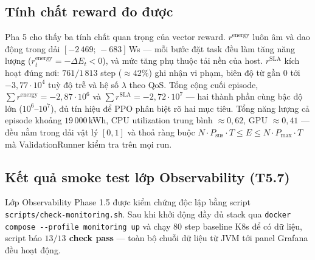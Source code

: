 \subsection{Tính chất reward đo được}
\label{ssec:res-reward-shape}

Pha 5 cho thấy ba tính chất quan trọng của vector reward.
$r^{\mathrm{energy}}$ luôn âm và dao động trong dải
$[-2\,469;\, -683]$\,Ws --- mỗi bước đặt task đều làm tăng năng lượng
($r^{\mathrm{energy}}_t = -\Delta E_t < 0$), và mức tăng phụ thuộc tải
nền của host. $r^{\mathrm{SLA}}$ kích hoạt đúng nơi: $761/1\,813$
step ($\approx 42\%$) ghi nhận vi phạm, biên độ từ gần $0$ tới
$-3{,}77\cdot 10^{4}$ tuỳ độ trễ và hệ số $\lambda$ theo QoS. Tổng
cộng cuối episode, $\sum r^{\mathrm{energy}} = -2{,}87\cdot 10^{6}$
và $\sum r^{\mathrm{SLA}} = -2{,}72\cdot 10^{7}$ --- hai thành phần
cùng bậc độ lớn ($10^6$--$10^7$), đủ tín hiệu để PPO phân biệt rõ hai
mục tiêu. Tổng năng lượng cả episode khoảng $19\,000$\,kWh, CPU
utilization trung bình $\approx 0{,}62$, GPU $\approx 0{,}41$ ---
đều nằm trong dải vật lý $[0,1]$ và thoả ràng buộc
$N \cdot P_{\mathrm{sus}} \cdot T \le E \le N \cdot P_{\max} \cdot T$
mà ValidationRunner kiểm tra trên mọi run.

\subsection{Kết quả smoke test lớp Observability (T5.7)}
\label{ssec:res-monitoring}

Lớp Observability Phase 1.5 được kiểm chứng độc lập bằng script
\texttt{scripts/check-monitoring.sh}. Sau khi khởi động đầy đủ stack
qua \texttt{docker compose -{}-profile monitoring up} và chạy 80 step
baseline K8s để có dữ liệu, script báo \textbf{$13/13$ check pass}
--- toàn bộ chuỗi dữ liệu từ JVM tới panel Grafana đều hoạt động.

